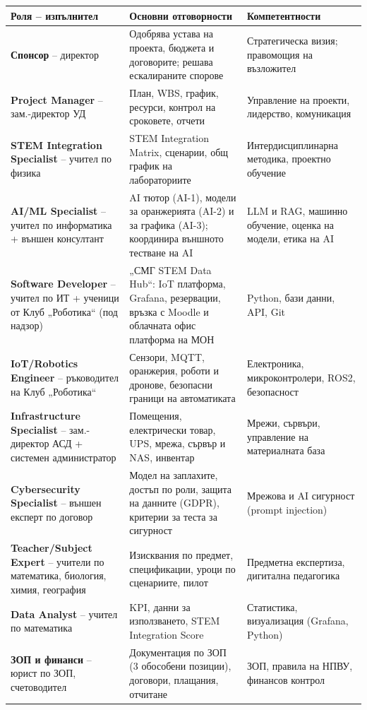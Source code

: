 \documentclass[11pt,a4paper]{article}
\renewcommand{\arraystretch}{1.15}
\begin{document}
{\footnotesize
\setlength{\tabcolsep}{4pt}
\renewcommand{\arraystretch}{1.08}
\begin{tabularx}{\textwidth}{@{}>{\raggedright\arraybackslash}p{4.3cm}>{\raggedright\arraybackslash}X>{\raggedright\arraybackslash}p{4.4cm}@{}}
\toprule
\textbf{Роля – изпълнител} & \textbf{Основни отговорности} & \textbf{Компетентности}\\
\midrule
\textbf{Спонсор} – директор & Одобрява устава на проекта, бюджета и договорите; решава ескалираните спорове & Стратегическа визия; правомощия на възложител\\
\textbf{Project Manager} – зам.-директор УД & План, WBS, график, ресурси, контрол на сроковете, отчети & Управление на проекти, лидерство, комуникация\\
\textbf{STEM Integration Specialist} – учител по физика & STEM Integration Matrix, сценарии, общ график на лабораториите & Интердисциплинарна методика, проектно обучение\\
\textbf{AI/ML Specialist} – учител по информатика + външен консултант & AI тютор (AI-1), модели за оранжерията (AI-2) и за графика (AI-3); координира външното тестване на AI & LLM и RAG, машинно обучение, оценка на модели, етика на AI\\
\textbf{Software Developer} – учител по ИТ + ученици от Клуб „Роботика“ (под надзор) & „СМГ STEM Data Hub“: IoT платформа, Grafana, резервации, връзка с Moodle и облачната офис платформа на МОН & Python, бази данни, API, Git\\
\textbf{IoT/Robotics Engineer} – ръководител на Клуб „Роботика“ & Сензори, MQTT, оранжерия, роботи и дронове, безопасни граници на автоматиката & Електроника, микроконтролери, ROS2, безопасност\\
\textbf{Infrastructure Specialist} – зам.-директор АСД + системен администратор & Помещения, електрически товар, UPS, мрежа, сървър и NAS, инвентар & Мрежи, сървъри, управление на материалната база\\
\textbf{Cybersecurity Specialist} – външен експерт по договор & Модел на заплахите, достъп по роли, защита на данните (GDPR), критерии за теста за сигурност & Мрежова и AI сигурност (prompt injection)\\
\textbf{Teacher/Subject Expert} – учители по математика, биология, химия, география & Изисквания по предмет, спецификации, уроци по сценариите, пилот & Предметна експертиза, дигитална педагогика\\
\textbf{Data Analyst} – учител по математика & KPI, данни за използването, STEM Integration Score & Статистика, визуализация (Grafana, Python)\\
\textbf{ЗОП и финанси} – юрист по ЗОП, счетоводител & Документация по ЗОП (3 обособени позиции), договори, плащания, отчитане & ЗОП, правила на НПВУ, финансов контрол\\
\bottomrule
\end{tabularx}}
\end{document}
